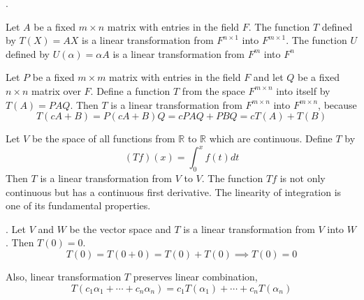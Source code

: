 \documentclass[8pt]{beamer}
\newcommand{\mbb}[1]{\mathbb{#1}}
\begin{document}
\begin{frame}{.}
    \begin{example}
        Let $A$ be a fixed $m \times n$ matrix with entries in the field $F$. The function $T$ defined by $T(X) = AX$ is a linear transformation from $F^
        {n\times 1}$ into $F^{m \times 1}$. The function $U$ defined by $U(\alpha) = \alpha A$ is a linear transformation from $F^m$ into $F^n$
    \end{example}

    \begin{example}
        Let $P$ be a fixed $m \times m$ matrix with entries in the field $F$ and let $Q$ be a fixed $n \times n$ matrix over $F$. Define a function $T$ from the space $F^{m \times n}$ into itself by $T(A) = PAQ$. Then $T$ is a linear transformation from $F^{m \times n}$ into $F^{m \times n}$, because
        \[
            T(cA + B) = P(cA + B)Q = cPAQ + PBQ = cT(A) + T(B)
        \]
    \end{example}

    \begin{example}
        Let $V$ be the space of all functions from $\mbb{R}$ to $\mbb{R}$ which are continuous. Define $T$ by 
        \[
            (Tf) (x) = \int_0^x f(t) dt
        \]
        Then $T$ is a linear transformation from $V$ to $V$.
        The function $Tf$ is not only continuous but has a continuous first derivative.
        The linearity of integration is one of its fundamental properties.
    \end{example}
\end{frame}

\begin{frame}{.}
    Let $V$ and $W$ be the vector space and $T$ is a linear transformation from $V$ into $W$.
    Then $T(0) = 0$.
    \[
        T(0) = T(0 + 0) = T(0) + T(0) \implies T(0) = 0
    \]
    \smallskip

    Also, linear transformation $T$ preserves linear combination,
    \[
        T(c_1\alpha_1 + \cdots + c_n \alpha_n) = c_1 T(\alpha_1) + \cdots + c_n T(\alpha_n)
    \]
\end{frame}
\end{document}
